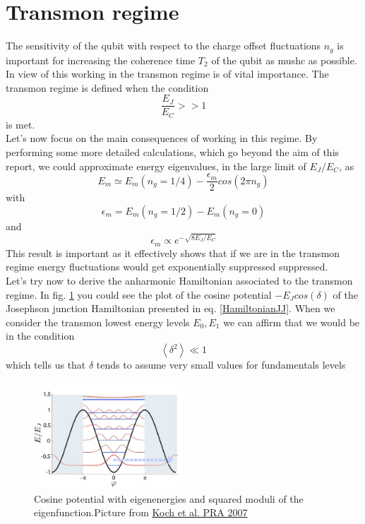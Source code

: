 \section{Transmon regime}
The sensitivity of the qubit with respect to the charge offset fluctuations $n_g$ is important for increasing the coherence time $T_2$ of the qubit as mushc as possible. In view of this working in the transmon regime is of vital importance. The transmon regime is defined when the condition $$\frac{E_J}{E_C} >> 1$$  is met.\\ Let's now focus on the main consequences of working in this regime.
By performing some more detailed calculations, which go beyond the aim of this report, we could approximate energy eigenvalues, in the large limit of $E_J/E_C$, as \begin{equation}
    E_m \simeq E_m(n_g = 1/4) - \frac{\epsilon_m}{2}cos(2\pi n_g)
\end{equation}
with 
\begin{equation}
    \epsilon_m =  E_m(n_g = 1/2)- E_m(n_g = 0)
\end{equation}
and
\begin{equation}
    \epsilon_m \propto e^{-\sqrt{8E_J/E_C}} 
\end{equation}
This result is important as it effectively shows that if we are in the transmon regime energy fluctuations would get exponentially suppressed suppressed. \\
Let's try now to derive the anharmonic Hamiltonian associated to the transmon regime. In fig. \ref{fig:transmon2} you could see the plot of the cosine potential $-E_Jcos(\delta)$ of the Josephson junction Hamiltonian presented in eq. \ref{HamiltonianJJ}. When we consider the transmon lowest energy levels $E_0, E_1$ we can affirm that we would be in the condition $$\left\langle\delta^2 \right\rangle \ll 1$$ which tells us that $\delta$ tends to assume very small values for fundamentals levels
\begin{figure}[h]
\centering
\includegraphics[width=0.5\textwidth]{pic/transmon/jj5.png}
\caption{Cosine potential with eigenenergies and squared moduli of the eigenfunction.Picture from \href{https://doi.org/10.1103/PhysRevA.76.042319}{Koch et al. PRA 2007}}
\label{fig:transmon2}
\end{figure}

